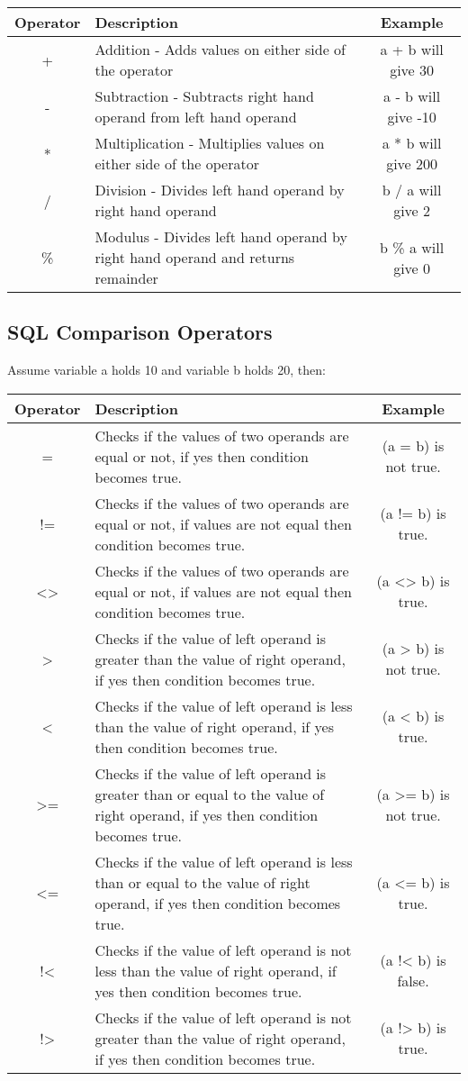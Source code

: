 \begin{center}
	\begin{tabular}{|c|p{9cm}|c|}
		\hline
		Operator	&	Description	&	Example\\
		\hline
		+	&	Addition - Adds values on either side of the operator	&	a + b will give 30\\
		-	&	Subtraction - Subtracts right hand operand from left hand operand	&	a - b will give -10\\
		*	&	Multiplication - Multiplies values on either side of the operator	&	a * b will give 200\\
		/	&	Division - Divides left hand operand by right hand operand	&	b / a will give 2\\
		\%	&	Modulus - Divides left hand operand by right hand operand and returns remainder	&	b \% a will give 0\\
		\hline
	\end{tabular}
\end{center}

\subsection{SQL Comparison Operators}
Assume variable a holds 10 and variable b holds 20, then:

\begin{center}
	\begin{tabular}{|c|p{9cm}|c|}
		\hline
		Operator	&	Description	&	Example\\
		\hline
		=	& Checks if the values of two operands are equal or not, if yes then condition becomes true.	& (a = b) is not true.\\
		!=	& Checks if the values of two operands are equal or not, if values are not equal then condition becomes true.	& (a != b) is true.\\
		<>	& Checks if the values of two operands are equal or not, if values are not equal then condition becomes true.	& (a <> b) is true.\\
		>	& Checks if the value of left operand is greater than the value of right operand, if yes then condition becomes true.	& (a > b) is not true.\\
		<	& Checks if the value of left operand is less than the value of right operand, if yes then condition becomes true.	& (a < b) is true.\\
		>=	& Checks if the value of left operand is greater than or equal to the value of right operand, if yes then condition becomes true.	& (a >= b) is not true.\\
		<=	& Checks if the value of left operand is less than or equal to the value of right operand, if yes then condition becomes true.	& (a <= b) is true.\\
		!<	& Checks if the value of left operand is not less than the value of right operand, if yes then condition becomes true.	& (a !< b) is false.\\
		!>	& Checks if the value of left operand is not greater than the value of right operand, if yes then condition becomes true.	& (a !> b) is true.\\
		\hline
	\end{tabular}
\end{center}


